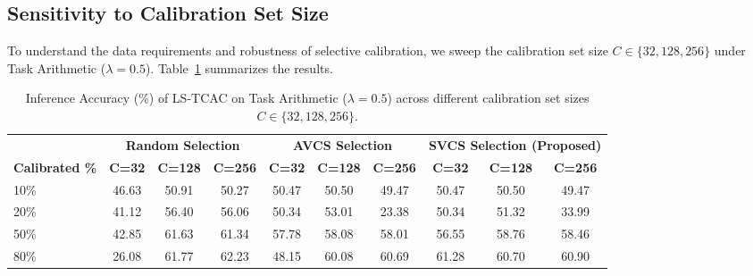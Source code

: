 \documentclass{article}
\theoremstyle{plain}
\theoremstyle{definition}
\theoremstyle{remark}
\begin{document}
\vspace{-2mm}
\subsection{Sensitivity to Calibration Set Size}
\vspace{-1mm}
To understand the data requirements and robustness of selective calibration, we sweep the calibration set size $C \in \{32, 128, 256\}$ under Task Arithmetic ($\lambda=0.5$). Table~\ref{tab:size_ablation} summarizes the results.

\begin{table}[t]
\centering
\vspace{-2mm}
\caption{Inference Accuracy (\%) of LS-TCAC on Task Arithmetic ($\lambda=0.5$) across different calibration set sizes $C \in \{32, 128, 256\}$.}
\label{tab:size_ablation}
\begin{small}
\begin{tabular}{lccccccccc}
\toprule
& \multicolumn{3}{c}{\textbf{Random Selection}} & \multicolumn{3}{c}{\textbf{AVCS Selection}} & \multicolumn{3}{c}{\textbf{SVCS Selection (Proposed)}} \\
\cmidrule(lr){2-4} \cmidrule(lr){5-7} \cmidrule(lr){8-10}
\textbf{Calibrated \%} & \textbf{C=32} & \textbf{C=128} & \textbf{C=256} & \textbf{C=32} & \textbf{C=128} & \textbf{C=256} & \textbf{C=32} & \textbf{C=128} & \textbf{C=256} \\
\midrule
10\% & 46.63 & 50.91 & 50.27 & 50.47 & 50.50 & 49.47 & 50.47 & 50.50 & 49.47 \\
20\% & 41.12 & 56.40 & 56.06 & 50.34 & 53.01 & 23.38 & 50.34 & 51.32 & 33.99 \\
50\% & 42.85 & 61.63 & 61.34 & 57.78 & 58.08 & 58.01 & 56.55 & 58.76 & 58.46 \\
80\% & 26.08 & 61.77 & 62.23 & 48.15 & 60.08 & 60.69 & 61.28 & 60.70 & 60.90 \\
\bottomrule
\end{tabular}
\end{small}
\end{table}
\vspace{-4mm}
\end{document}

